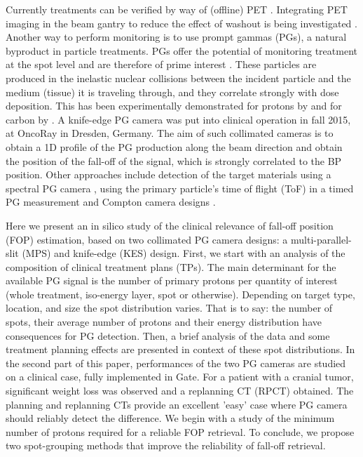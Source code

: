\documentclass[a4paper,english]{article}
\begin{document}
Currently treatments can be verified by way of (offline) PET \citep{Kraan2015}. Integrating PET imaging in the beam gantry to reduce the effect of washout is being investigated \citep{Sportelli2013}. Another way to perform monitoring is to use prompt gammas (PGs), a natural byproduct in particle treatments. PGs offer the potential of monitoring treatment at the spot level \citep{Smeets2012,Roellinghoff2014a} and are therefore of prime interest \citep{Moteabbed2011,Gueth2013,Golnik2014a,Janssen2014}. These particles are produced in the inelastic nuclear collisions between the incident particle and the medium (tissue) it is traveling through, and they correlate strongly with dose deposition. This has been experimentally demonstrated for protons by \citet{Min2006} and for carbon by \citet{Testa2008}. A knife-edge PG camera \citep{Perali2014,Richter2016} was put into clinical operation in fall 2015, at OncoRay in Dresden, Germany. The aim of such collimated cameras is to obtain a 1D profile of the PG production along the beam direction and obtain the position of the fall-off of the signal, which is strongly correlated to the BP position. Other approaches include detection of the target materials using a spectral PG camera \citep{Verburg2014}, using the primary particle's time of flight (ToF) in a timed PG measurement \citep{Golnik2014a} and Compton camera designs \citep{Roellinghoff2011,Kurosawa2012,Solevi2016,Thirolf2016,Polf2015,Llosa2016}.

Here we present an in silico study of the clinical relevance of fall-off position (FOP) estimation, based on two collimated PG camera designs: a multi-parallel-slit (MPS) and knife-edge (KES) design. First, we start with an analysis of the composition of clinical treatment plans (TPs). The main determinant for the available PG signal is the number of primary protons per quantity of interest (whole treatment, iso-energy layer, spot or otherwise). Depending on target type, location, and size the spot distribution varies. That is to say: the number of spots, their average number of protons and their energy distribution have consequences for PG detection. Then, a brief analysis of the data and some treatment planning effects are presented in context of these spot distributions. In the second part of this paper, performances of the two PG cameras are studied on a clinical case, fully implemented in Gate. For a patient with a cranial tumor, significant weight loss was observed and a replanning CT (RPCT) obtained. The planning and replanning CTs provide an excellent 'easy' case where PG camera should reliably detect the difference. We begin with a study of the minimum number of protons required for a reliable FOP retrieval. To conclude, we propose two spot-grouping methods that improve the reliability of fall-off retrieval. %
\end{document}
